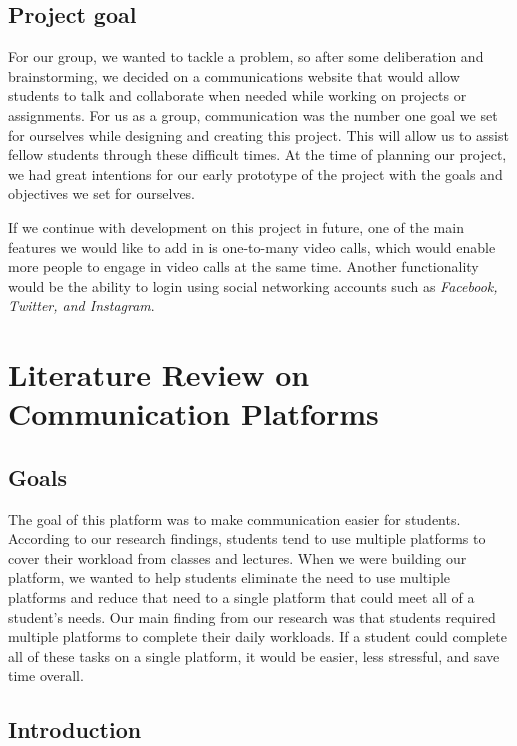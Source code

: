 \section{Project goal}


For our group, we wanted to tackle a problem, so after some deliberation and brainstorming, we decided on a communications website that would allow students to talk and collaborate when needed while working on projects or assignments. For us as a group, communication was the number one goal we set for ourselves while designing and creating this project. This will allow us to assist fellow students through these difficult times. At the time of planning our project, we had great intentions for our early prototype of the project with the goals and objectives we set for ourselves.

If we continue with development on this project in future, one of the main features we would like to add in is one-to-many video calls, which would enable more people to engage in video calls at the same time. Another functionality would be the ability to login using social networking accounts such as \textit{Facebook\cite{ref10}, Twitter\cite{ref11}, and Instagram\cite{ref12}}. 


\chapter{Literature Review on Communication Platforms}
\section{Goals}
The goal of this platform was to make communication easier for students. According to our research findings, students tend to use multiple platforms to cover their workload from classes and lectures. When we were building our platform, we wanted to help students eliminate the need to use multiple platforms and reduce that need to a single platform that could meet all of a student's needs.
Our main finding from our research was that students required multiple platforms to complete their daily workloads. If a student could complete all of these tasks on a single platform, it would be easier, less stressful, and save time overall.

\section{Introduction}

